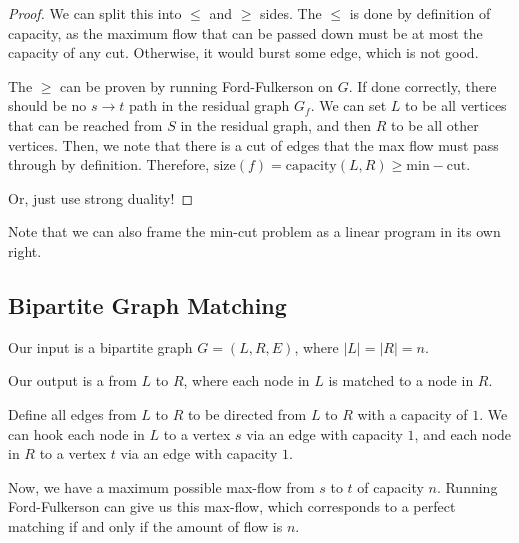 \documentclass{article}
\begin{document}
\begin{proof}
    We can split this into $\leq$ and $\geq$ sides. The $\leq$ is done by definition of capacity, as the maximum flow that can be passed down must be at most the capacity of any cut. Otherwise, it would burst some edge, which is not good.

    The $\geq$ can be proven by running Ford-Fulkerson on $G$. If done correctly, there should be no $s \to t$ path in the residual graph $G_f$. We can set $L$ to be all vertices that can be reached from $S$ in the residual graph, and then $R$ to be all other vertices. Then, we note that there is a cut of edges that the max flow must pass through by definition. Therefore, $\mathrm{size}(f) = \mathrm{capacity}(L, R) \geq \mathrm{min-cut}$.

    Or, just use strong duality!
\end{proof}

Note that we can also frame the min-cut problem as a linear program in its own right. 

\subsection{Bipartite Graph Matching}
Our input is a bipartite graph $G = (L, R, E)$, where $|L| = |R| = n$. 

Our output is a  from $L$ to $R$, where each node in $L$ is matched to a node in $R$.

Define all edges from $L$ to $R$ to be directed from $L$ to $R$ with a capacity of $1$. We can hook each node in $L$ to a vertex $s$ via an edge with capacity $1$, and each node in $R$ to a vertex $t$ via an edge with capacity $1$. 

Now, we have a maximum possible max-flow from $s$ to $t$ of capacity $n$. Running Ford-Fulkerson can give us this max-flow, which corresponds to a perfect matching if and only if the amount of flow is $n$. 
\end{document}
